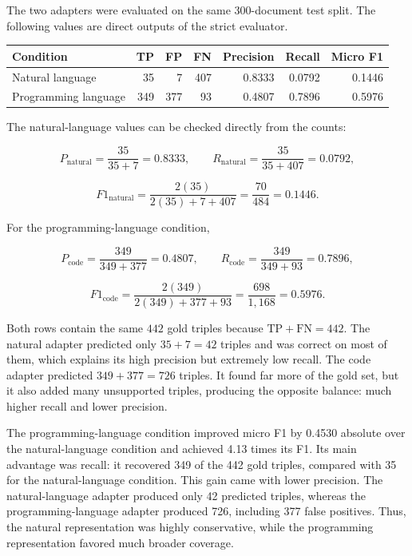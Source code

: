 \documentclass[11pt]{article}
\begin{document}
The two adapters were evaluated on the same 300-document test split. The
following values are direct outputs of the strict evaluator.

\begin{center}
\small
\setlength{\tabcolsep}{5pt}
\begin{tabular}{lrrrrrr}
\toprule
\textbf{Condition} & \textbf{TP} & \textbf{FP} & \textbf{FN} &
\textbf{Precision} & \textbf{Recall} & \textbf{Micro F1} \\
\midrule
Natural language & 35 & 7 & 407 & 0.8333 & 0.0792 & 0.1446 \\
Programming language & 349 & 377 & 93 & 0.4807 & 0.7896 & 0.5976 \\
\bottomrule
\end{tabular}
\normalsize
\end{center}

The natural-language values can be checked directly from the counts:

\[
P_{\mathrm{natural}}=\frac{35}{35+7}=0.8333,
\qquad
R_{\mathrm{natural}}=\frac{35}{35+407}=0.0792,
\]

\[
F1_{\mathrm{natural}}
=\frac{2(35)}{2(35)+7+407}
=\frac{70}{484}=0.1446.
\]

For the programming-language condition,

\[
P_{\mathrm{code}}=\frac{349}{349+377}=0.4807,
\qquad
R_{\mathrm{code}}=\frac{349}{349+93}=0.7896,
\]

\[
F1_{\mathrm{code}}
=\frac{2(349)}{2(349)+377+93}
=\frac{698}{1{,}168}=0.5976.
\]

Both rows contain the same $442$ gold triples because
$\mathrm{TP}+\mathrm{FN}=442$. The natural adapter predicted only
$35+7=42$ triples and was correct on most of them, which explains its
high precision but extremely low recall. The code adapter predicted
$349+377=726$ triples. It found far more of the gold set, but it also
added many unsupported triples, producing the opposite balance: much
higher recall and lower precision.

The programming-language condition improved micro F1 by 0.4530 absolute
over the natural-language condition and achieved 4.13 times its F1. Its
main advantage was recall: it recovered 349 of the 442 gold triples,
compared with 35 for the natural-language condition. This gain came with
lower precision. The natural-language adapter produced only 42 predicted
triples, whereas the programming-language adapter produced 726, including
377 false positives. Thus, the natural representation was highly
conservative, while the programming representation favored much broader
coverage.
\end{document}
